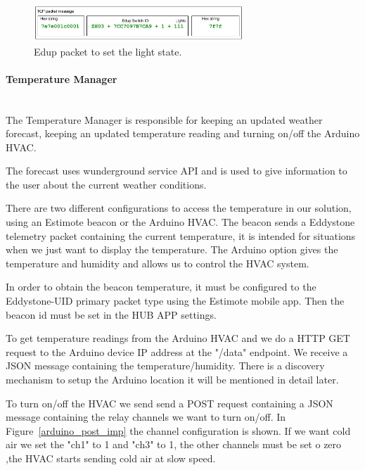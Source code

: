 \begin{figure}[h]
\centering
\includegraphics[width=0.7\textwidth]{Figures/Edup_imp}
\caption{Edup packet to set the light state.}
\label{edup_imp}
\end{figure}


\paragraph{Temperature Manager}\mbox{}\\


The Temperature Manager is responsible for keeping an updated weather forecast, keeping an updated temperature reading and turning on/off the Arduino \ac{HVAC}.

The forecast uses wunderground service API and is used to give information to the user about the current weather conditions.

There are two different configurations to access the temperature in our solution, using an Estimote beacon or the Arduino \ac{HVAC}. 
The beacon sends a Eddystone telemetry packet containing the current temperature, it is intended for situations when we just want to display the temperature.
The Arduino option gives the temperature and humidity and allows us to control the \ac{HVAC} system.


In order to obtain the beacon temperature, it must be configured to the Eddystone-UID primary packet type using the Estimote mobile app. Then the beacon id must be set in the HUB APP settings.

To get temperature readings from the Arduino \ac{HVAC} and we do a \ac{HTTP}  GET request to the Arduino device IP address at the "/data" endpoint. We receive a \ac{JSON} message containing the temperature/humidity. There is a discovery mechanism to setup the Arduino location it will be mentioned in detail later.

To turn on/off the \ac{HVAC} we send send a POST request containing a \ac{JSON} message containing the relay channels we want to turn on/off. In Figure~\ref{arduino_post_imp} the channel configuration is shown. If we want cold air we set the "ch1" to 1 and "ch3" to 1, the other channels must be set o zero ,the \ac{HVAC} starts sending cold air at slow speed.


